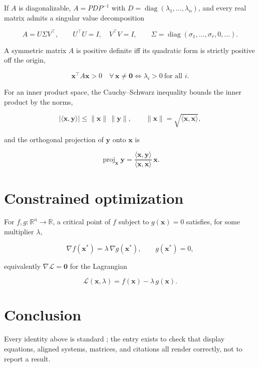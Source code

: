\documentclass{article}
\begin{document}
If $A$ is diagonalizable, $A = P D P^{-1}$ with $D = \operatorname{diag}(\lambda_1,
\ldots, \lambda_n)$, and every real matrix admits a singular value decomposition

\begin{equation}
  A = U \Sigma V^{\!\top}, \qquad U^{\!\top} U = I, \quad V^{\!\top} V = I,
  \qquad \Sigma = \operatorname{diag}(\sigma_1, \ldots, \sigma_r, 0, \ldots).
\end{equation}

A symmetric matrix $A$ is positive definite iff its quadratic form is strictly
positive off the origin,

\begin{equation}
  \mathbf{x}^{\!\top} A \mathbf{x} > 0 \quad \forall \, \mathbf{x} \neq \mathbf{0}
  \iff \lambda_i > 0 \ \text{for all } i.
\end{equation}

For an inner product space, the Cauchy--Schwarz inequality bounds the inner
product by the norms,

\begin{equation}
  |\langle \mathbf{x}, \mathbf{y} \rangle| \le \lVert \mathbf{x} \rVert \, \lVert \mathbf{y} \rVert,
  \qquad \lVert \mathbf{x} \rVert = \sqrt{\langle \mathbf{x}, \mathbf{x} \rangle},
\end{equation}

and the orthogonal projection of $\mathbf{y}$ onto $\mathbf{x}$ is

\begin{equation}
  \operatorname{proj}_{\mathbf{x}} \mathbf{y}
    = \frac{\langle \mathbf{x}, \mathbf{y} \rangle}{\langle \mathbf{x}, \mathbf{x} \rangle} \, \mathbf{x}.
\end{equation}

\section{Constrained optimization}

For $f, g : \mathbb{R}^n \to \mathbb{R}$, a critical point of $f$ subject to
$g(\mathbf{x}) = 0$ satisfies, for some multiplier $\lambda$,

\begin{equation}
  \nabla f(\mathbf{x}^{*}) = \lambda \, \nabla g(\mathbf{x}^{*}), \qquad
  g(\mathbf{x}^{*}) = 0,
\end{equation}

equivalently $\nabla \mathcal{L} = \mathbf{0}$ for the Lagrangian

\begin{equation}
  \mathcal{L}(\mathbf{x}, \lambda) = f(\mathbf{x}) - \lambda \, g(\mathbf{x}).
\end{equation}

\section{Conclusion}

Every identity above is standard \cite{strang2016,apostol1969}; the entry
exists to check that display equations, aligned systems, matrices, and
citations all render correctly, not to report a result.
\end{document}
